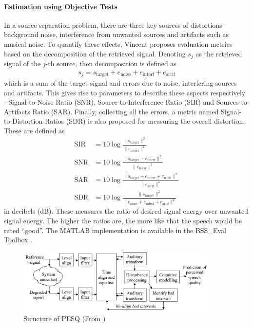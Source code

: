 \documentclass[a4paper,twoside,12pt,hidelinks]{article}
\begin{document}
\paragraph{Estimation using Objective Tests}
In a source separation problem, there are three key sources of distortions - background noise, interference from unwanted sources and artifacts such as musical noise. To quantify these effects, Vincent \cite{Vincent2006PerformanceSeparation} proposes evaluation metrics based on the decomposition of the retrieved signal. Denoting $s_j$ as the retrieved signal of the $j$-th source, then decomposition is defined as
\begin{align}
s_j = s_{\text{target}} + e_{\text{noise}} +e_{\text{interf}} +e_{\text{artif}}
\end{align}
which is a sum of the target signal and errors due to noise, interfering sources and artifacts. This gives rise to parameters to describe these aspects respectively - Signal-to-Noise Ratio (SNR), Source-to-Interference Ratio (SIR) and Sources-to-Artifacts Ratio (SAR). Finally, collecting all the errors, a metric named Signal-to-Distortion Ratios (SDR) is also proposed for measuring the overall distortion. These are defined as
\begin{align}
\text{SIR} &= 10\log\frac{\|s_{\text{target}}\|^2}{\|e_{\text{interf}}\|^2}\\
\text{SNR} &= 10\log\frac{\|s_{\text{target}}+e_{\text{interf}}\|^2}{\|e_{\text{noise}}\|^2} \\
\text{SAR} &= 10\log\frac{\|s_{\text{target}}+e_{\text{interf}}+e_{\text{noise}}\|^2}{\|e_{\text{artif}}\|^2}\\
\text{SDR} &= 10\log\frac{\|s_{\text{target}}\|^2}{\|e_{\text{noise}} +e_{\text{interf}} +e_{\text{artif}}\|^2}
\end{align}
in decibels (dB). These measures the ratio of desired signal energy over unwanted signal energy. The higher the ratios are, the more like that the speech would be rated ``good''. The MATLAB implementation is available in the BSS\_Eval Toolbox \cite{Fevotte2005BSS_EVAL2.0}.

\begin{figure}[H]
\centering
\includegraphics[width=0.9\textwidth]{pesq}
\caption{Structure of PESQ (From \cite{RixPerceptualCodecs})}
\label{fig:pesq}
\end{figure}
\end{document}
